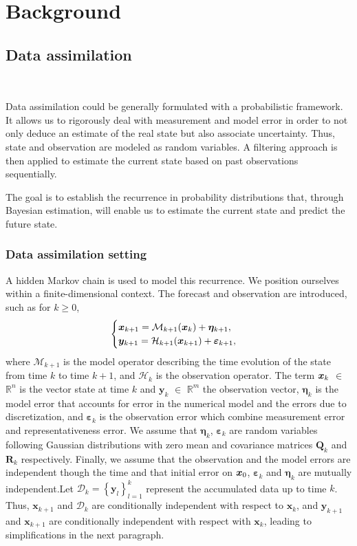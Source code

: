 
\section{Background}

\subsection{Data assimilation}~\label{Background_DA}

Data assimilation could be generally formulated with a probabilistic framework. It allows us to rigorously deal with measurement and model error in order to not only deduce an estimate of the real state but also associate uncertainty. Thus, state and observation are modeled as random variables. A filtering approach is then applied to estimate the current state based on past observations sequentially.

The goal is to establish the recurrence in probability distributions that, through Bayesian estimation, will enable us to estimate the current state and predict the future state.


\subsubsection{Data assimilation setting}

A hidden Markov chain is used to model this recurrence. We position ourselves within a finite-dimensional context. The forecast and observation are introduced, such as for $ k \geq 0$,
\[
    \begin{cases}
        \bm{x}_{k+1} = \mathcal{M}_{k+1} (\bm{x}_{k}) + \bm{\eta}_{k+1}, \\
        \bm{y}_{k+1} = \mathcal{H}_{k+1} (\bm{x}_{k+1}) + \bm \varepsilon_{k+1},
    \end{cases}
\]where $\mathcal{M}_{k+1}$ is the model operator describing the time evolution of the state from time $k$ to time $k+1$, and $\mathcal{H}_k$ is the observation operator. The term $\bm{x}_k$ $\in$ $\mathbb{R}^n$ is the vector state at time $k$ and $\bm{y}_k$ $\in$ $\mathbb{R}^m$ the observation vector, $\bm{\eta}_{k}$ is the model error that accounts for error in the numerical model and the errors due to discretization, and $\bm{\varepsilon}_k$ is the observation error which combine measurement error and representativeness error. We assume that $\bm{\eta}_{k}$, $\bm{\varepsilon}_k$ are random variables following Gaussian distributions with zero mean and covariance matrices $\bm Q_k$ and $\bm R_k$ respectively. Finally, we assume that the observation and the model errors are independent though the time and that initial error on $\bm{x}_0$, $\bm{\varepsilon}_k$ and $\bm{\eta}_{k}$ are mutually independent.Let $\mathcal{D}_k = \left\{\bm y_l\right\}_{l=1}^k$ represent the accumulated data up to time $k$.
Thus, $\bm x_{k+1}$ and $\mathcal{D}_k$ are conditionally independent with respect to $\bm x_{k}$, and $\bm{y}_{k+1}$ and $\bm x_{k+1}$ are conditionally independent with respect with $\bm x_{k}$, leading to simplifications in the next paragraph.

